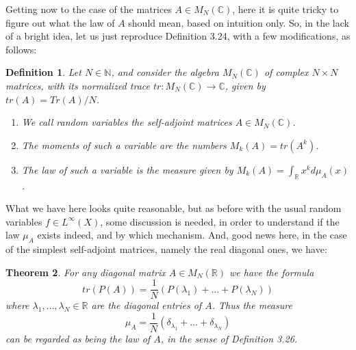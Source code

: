 \documentclass[12pt]{amsbook}
\newtheorem{theorem}{Theorem}[chapter]
\newtheorem{definition}[theorem]{Definition}
\begin{document}
Getting now to the case of the matrices $A\in M_N(\mathbb C)$, here it is quite tricky to figure out what the law of $A$ should mean, based on intuition only. So, in the lack of a bright idea, let us just reproduce Definition 3.24, with a few modifications, as follows:

\begin{definition}
Let $N\in\mathbb N$, and consider the algebra $M_N(\mathbb C)$ of complex $N\times N$ matrices, with its normalized trace $tr:M_N(\mathbb C)\to\mathbb C$, given by $tr(A)=Tr(A)/N$.
\begin{enumerate}
\item We call random variables the self-adjoint matrices $A\in M_N(\mathbb C)$.

\item The moments of such a variable are the numbers $M_k(A)=tr(A^k)$.

\item The law of such a variable is the measure given by $M_k(A)=\int_\mathbb Rx^kd\mu_A(x)$.
\end{enumerate}
\end{definition}

What we have here looks quite reasonable, but as before with the usual random variables $f\in L^\infty(X)$, some discussion is needed, in order to understand if the law $\mu_A$ exists indeed, and by which mechanism. And, good news here, in the case of the simplest self-adjoint matrices, namely the real diagonal ones, we have:

\begin{theorem}
For any diagonal matrix $A\in M_N(\mathbb R)$ we have the formula
$$tr(P(A))=\frac{1}{N}(P(\lambda_1)+\ldots+P(\lambda_N))$$
where $\lambda_1,\ldots,\lambda_N\in\mathbb R$ are the diagonal entries of $A$. Thus the measure
$$\mu_A=\frac{1}{N}(\delta_{\lambda_1}+\ldots+\delta_{\lambda_N})$$
can be regarded as being the law of $A$, in the sense of Definition 3.26.
\end{theorem}
\end{document}
